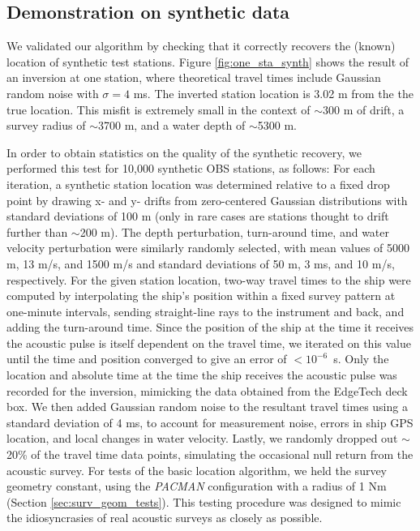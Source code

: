 
\subsection{Demonstration on synthetic data}
We validated our algorithm by checking that it correctly recovers the (known) location of synthetic test stations. Figure \ref{fig:one_sta_synth} shows the result of an inversion at one station, where theoretical travel times include Gaussian random noise with $\sigma= 4$ ms. The inverted station location is 3.02 m from the the true location. This misfit is extremely small in the context of $\sim$300 m of drift, a survey radius of $\sim$3700 m, and a water depth of $\sim$5300 m.

In order to obtain statistics on the quality of the synthetic recovery, we performed this test for 10,000 synthetic OBS stations, as follows: For each iteration, a synthetic station location was determined relative to a fixed drop point by drawing x- and y- drifts from zero-centered Gaussian distributions with standard deviations of 100 m (only in rare cases are stations thought to drift further than $\sim$200 m). The depth perturbation, turn-around time, and water velocity perturbation were similarly randomly selected, with mean values of 5000 m, 13 m/s, and 1500 m/s and standard deviations of 50 m, 3 ms, and 10 m/s, respectively. For the given station location, two-way travel times to the ship were computed by interpolating the ship's position within a fixed survey pattern at one-minute intervals, sending straight-line rays to the instrument and back, and adding the turn-around time. Since the position of the ship at the time it receives the acoustic pulse is itself dependent on the travel time, we iterated on this value until the time and position converged to give an error of \mbox{$<10^{-6}$ s}. Only the location and absolute time at the time the ship receives the acoustic pulse was recorded for the inversion, mimicking the data obtained from the EdgeTech deck box. We then added Gaussian random noise to the resultant travel times using a standard deviation of 4 ms, to account for measurement noise, errors in ship GPS location, and local changes in water velocity. Lastly, we randomly dropped out $\sim$20\% of the travel time data points, simulating the occasional null return from the acoustic survey. For tests of the basic location algorithm, we held the survey geometry constant, using the \textit{PACMAN} configuration with a radius of 1 Nm (Section \ref{sec:surv_geom_tests}). This testing procedure was designed to mimic the idiosyncrasies of real acoustic surveys as closely as possible. 

